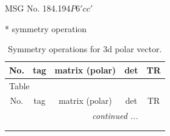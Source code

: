 \documentclass[fleqn,8pt]{jsarticle}
\begin{document}
\setcounter{MaxMatrixCols}{32}

\renewcommand{\tablename}{Table~}
\renewcommand{\figurename}{Figure~}
\begin{center}
\LARGE
MSG No. 184.194\quad$P6'cc'$
\end{center}
* symmetry operation
\renewcommand{\arraystretch}{1.3}
\begin{longtable}{ccccc}
\caption{Symmetry operations for 3d polar vector.}
 \\
 \hline \hline
No. & tag & matrix (polar) & det & TR \\ \hline \endfirsthead

\multicolumn{4}{l}{\tablename\ \thetable{}} \\
 \hline \hline
No. & tag & matrix (polar) & det & TR \\ \hline \endhead

 \hline \hline
\multicolumn{4}{r}{\footnotesize\it continued ...} \\ \endfoot

 \hline \hline
\multicolumn{4}{r}{} \\ \endlastfoot


\end{longtable}
\end{document}
